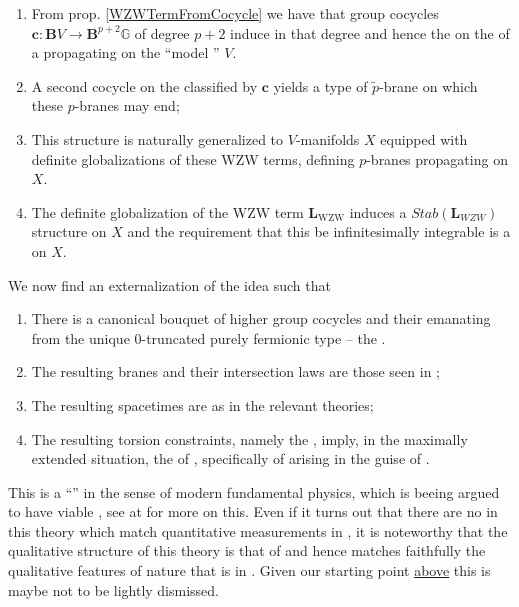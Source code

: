 \documentclass[12pt,titlepage]{article}
\theoremstyle{plain}
\theoremstyle{definition}
\theoremstyle{remark}
\begin{document}
\begin{enumerate}%
\item From prop. \ref{WZWTermFromCocycle} we have that group cocycles $\mathbf{c}\colon \mathbf{B}V \longrightarrow \mathbf{B}^{p+2}\mathbb{G}$ of degree $p+2$ induce  in that degree and hence the    on the  of a  propagating on the ``model '' $V$.
\item A second cocycle on the  classified by $\mathbf{c}$ yields a type of $\tilde p$-brane on which these $p$-branes may end;
\item This structure is naturally generalized to $V$-manifolds $X$ equipped with definite globalizations of these WZW terms, defining $p$-branes propagating on $X$.
\item The definite globalization of the WZW term $\mathbf{L}_{\mathrm{WZW}}$ induces a $Stab(\mathbf{L}_{WZW})$ structure on $X$ and the requirement that this be infinitesimally integrable is a  on $X$.
\end{enumerate}
We now find an externalization of the idea such that
\begin{enumerate}%
\item There is a canonical bouquet of higher group cocycles and their  emanating from the unique 0-truncated purely fermionic type -- the .
\item The resulting branes and their intersection laws are those seen in ;
\item The resulting spacetimes are  as in the relevant  theories;
\item The resulting torsion constraints, namely the , imply, in the maximally extended situation, the   of , specifically of  arising in the guise of .
\end{enumerate}
This is a ``'' in the sense of modern fundamental physics, which is beeing argued to have viable , see at  for more on this. Even if it turns out that there are no  in this theory which match quantitative measurements in , it is noteworthy that the qualitative structure of this theory is that of  and hence matches faithfully the qualitative features of nature that is in . Given our starting point \hyperlink{TheGround}{above} this is maybe not to be lightly dismissed.
\end{document}
